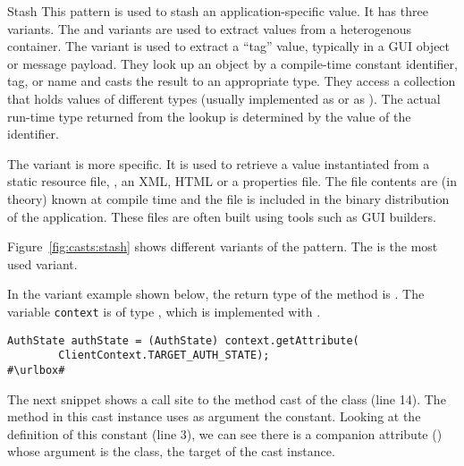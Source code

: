 \begin{pattern}{Stash}
This pattern is used to stash an application-specific value.
It has three variants.
The  and  variants are used to extract values from a heterogenous container.
The  variant is used to extract a ``tag'' value, 
typically in a GUI object or message payload.
They look up an object by a compile-time constant identifier, tag, or name and casts the result to an appropriate type.
They access a collection that holds values of different types
(usually implemented as  or as ).
The actual run-time type returned from the lookup is determined by the value of the identifier.

The  variant is more specific.
It is used to retrieve a value instantiated from a static resource file,
\eg, an XML, HTML or a \java{} properties file.
The file contents are (in theory) known at compile time and the file is included in the binary distribution of the application.
These files are often built using tools such as GUI builders.

\instances{}
Figure~\ref{fig:casts:stash} shows different variants of the pattern.
The  is the most used variant.


In the  variant example shown below,
the return type of the  method is .
The variable \texttt{context} is of type ,
which is implemented with .

\def\urlvar{http://bit.ly/loopj_android_async_http_2SUzY4E}
\begin{verbatim}
AuthState authState = (AuthState) context.getAttribute(
        ClientContext.TARGET_AUTH_STATE);
#\urlbox#
\end{verbatim}

The next snippet shows a call site to the  method cast of the  class (line 14).
The  method in this cast instance uses as argument the  constant.
Looking at the definition of this constant (line 3),
we can see there is a companion attribute () whose argument is the  class, the target of the cast instance.


\end{pattern}
